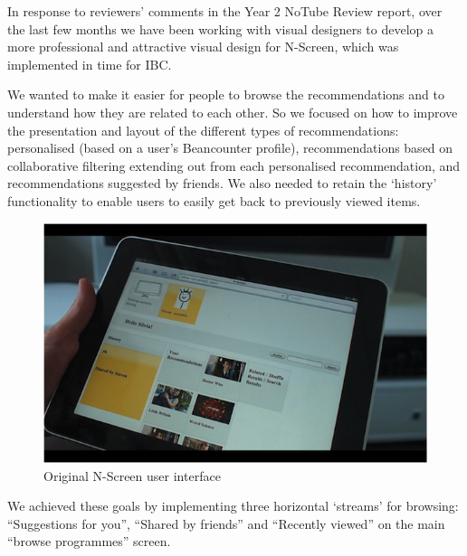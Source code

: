 \documentclass{notube}
\begin{document}
In response to reviewers’ comments in the Year 2 NoTube Review report, over the last few months we have been working with visual designers to develop a more professional and attractive visual design for N-Screen, which was implemented in time for IBC. 

We wanted to make it easier for people to browse the recommendations and to understand how they are related to each other. So we focused on how to improve the presentation and layout of the different types of recommendations: personalised (based on a user’s Beancounter profile), recommendations based on collaborative filtering extending out from each personalised recommendation, and recommendations suggested by friends. We also needed to retain the `history’ functionality to enable users to easily get back to previously viewed items. 

\begin{figure}[htbp]
\begin{center}
\includegraphics[width=6in]{images/ns_original.png}
\caption{Original N-Screen user interface} \label{fig:nsoriginal}
\end{center}
\end{figure}

 We achieved these goals by implementing three horizontal `streams’ for browsing: ``Suggestions for you”, ``Shared by friends” and ``Recently viewed” on the main ``browse programmes” screen. 
 
\end{document}
